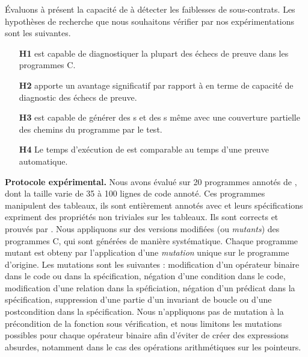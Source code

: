 Évaluons à présent la capacité de \stady à détecter les faiblesses de
sous-contrats.
Les hypothèses de recherche que nous souhaitons vérifier par nos
expérimentations sont les suivantes.

\begin{itemize}
\item[\textbf{H1}]
  \stady est capable de diagnostiquer la plupart des échecs de preuve dans les
  programmes C.

\item[\textbf{H2}]
  \SWD apporte un avantage significatif par rapport à \NCD en terme de capacité
  de diagnostic des échecs de preuve.

\item[\textbf{H3}]
  \stady est capable de générer des \NCCE{}s et des \SWCE{}s même avec une
  couverture partielle des chemins du programme par le test.

\item[\textbf{H4}]
  Le temps d'exécution de \stady est comparable au temps d'une preuve
  automatique.
\end{itemize}


\textbf{Protocole expérimental.}
Nous avons évalué \stady sur 20 programmes annotés de \cite{ACSLbyExample},
dont la taille varie de 35 à 100 lignes de code annoté.
Ces programmes manipulent des tableaux, ils sont entièrement annotés avec \eacsl
et leurs spécifications expriment des propriétés non triviales sur les tableaux.
Ils sont corrects et prouvés par \Wp.
Nous appliquons \stady sur des versions modifiées (ou {\em mutants}) des
programmes C, qui sont générées de manière systématique.
Chaque programme mutant est obteny par l'application d'une {\em mutation} unique
sur le programme d'origine.
Les mutations sont les suivantes : modification d'un opérateur binaire dans le
code ou dans la spécification, négation d'une condition dans le code,
modification d'une relation dans la spéficiation, négation d'un prédicat dans la
spécification, suppression d'une partie d'un invariant de boucle ou d'une
postcondition dans la spécification.
Nous n'appliquons pas de mutation à la précondition de la fonction sous
vérification, et nous limitons les mutations possibles pour chaque opérateur
binaire afin d'éviter de créer des expressions absurdes, notamment dans le
cas des opérations arithmétiques sur les pointeurs.

